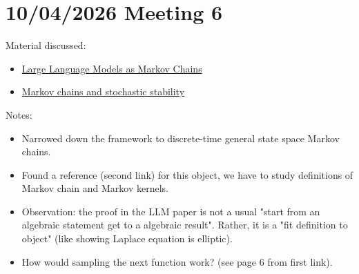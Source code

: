 \documentclass{article}
\begin{document}
\section{10/04/2026 Meeting 6}
Material discussed:
\begin{itemize}
    \item \href{https://arxiv.org/abs/2410.02724}{Large Language Models as Markov Chains}
    \item \href{https://www.cambridge.org/core/books/markov-chains-and-stochastic-stability/E2B82BFB409CD2F7D67AFC5390C565EC}{Markov chains and stochastic stability}
\end{itemize}
Notes:
\begin{itemize}
   \item Narrowed down the framework to discrete-time general state space Markov chains.
   \item Found a reference (second link) for this object, we have to study definitions of Markov chain and Markov kernels.
   \item Observation: the proof in the LLM paper is not a usual "start from an algebraic statement get to a algebraic result". Rather, it is a "fit definition to object" (like showing Laplace equation is elliptic).
    \item How would sampling the next function work? (see page 6 from first link).
\end{itemize}
\end{document}
